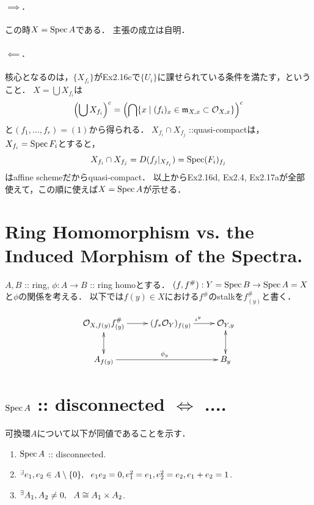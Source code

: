 \documentclass[a4paper]{jsarticle}
\begin{document}
    \paragraph{$\implies$.}
    この時$X=\operatorname{Spec} A$である．
    主張の成立は自明．

    \paragraph{$\impliedby$.}
    核心となるのは，$\{X_{f_i}\}$がEx2.16cで$\{U_i\}$に課せられている条件を満たす，ということ．
    $X=\bigcup X_{f_i}$は
    \[ \left( \bigcup X_{f_i} \right)^c=\left( \bigcap \{x \mid (f_i)_x \in \mathfrak{m}_{X,x} \subset \mathcal{O}_{X,x}\} \right)^c \]
    と$(f_1,\dots,f_r)=(1)$から得られる．
    $X_{f_i} \cap X_{f_j}$ ::quasi-compactは，$X_{f_i}=\operatorname{Spec} F_i$とすると，
    \[ X_{f_i} \cap X_{f_j}=D(f_j|_{X_{f_i}})=\operatorname{Spec} (F_i)_{f_j} \]はaffine schemeだからquasi-compact．
    以上からEx2.16d, Ex2.4, Ex2.17aが全部使えて，この順に使えば$X=\operatorname{Spec} A$が示せる．

\section{Ring Homomorphism vs. the Induced Morphism of the Spectra.} %
    $A,B$ :: ring, $\phi: A \to B$ :: ring homoとする．
    $(f,f^{\#}): Y=\operatorname{Spec} B \to \operatorname{Spec} A=X$と$\phi$の関係を考える．
    以下では$f(y) \in X$における$f^{\#}$のstalkを$f^{\#}_{(y)}$と書く．

    \[
        \xymatrix
        {
        \shO_{X,f(y)} \ar[r]^{}f^{\#}_{(y)} & (f_* \shO_{Y})_{f(y)} \ar[r]^{\iota^y}& \shO_{Y,y} \\
        A_{f(y)} \ar@{<->}[u] \ar[rr]^{\phi_{y}} & {} & B_y \ar@{<->}[u]
        }
    \]


\section{$\operatorname{Spec} A$ :: disconnected $\iff$ ....} %
    可換環$A$について以下が同値であることを示す．
    \begin{enumerate}[label=(\arabic*)]
    \item $\operatorname{Spec} A$ :: disconnected.
    \item ${}^{\exists} e_1, e_2 \in A \setminus \{0\},~~ e_1e_2=0, e_1^2=e_1, e_2^2=e_2, e_1+e_2=1$.
    \item ${}^{\exists} A_1, A_2 \neq 0,~~ A \cong A_1 \times A_2$.
    \end{enumerate}
\end{document}
